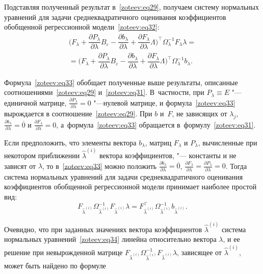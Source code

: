 Подставляя полученный результат в~\eqref{zoteev:eq29}, получаем систему нормальных уравнений для задачи среднеквадратичного оценивания коэффициентов обобщенной регрессионной модели~\eqref{zoteev:eq32}:
\begin{multline}
\Big(F_\lambda+\dfrac{\partial P_\lambda}{\partial \lambda}B_\varepsilon-\dfrac{\partial b_\lambda}{\partial \lambda}+\dfrac{\partial F_\lambda}{\partial \lambda}\Lambda\Big)^{\top}\Omega_\lambda^{-1}F_\lambda \lambda  
=
\\
=\Big(F_\lambda+\dfrac{\partial P_\lambda}{\partial \lambda}B_\varepsilon-\dfrac{\partial b_\lambda}{\partial \lambda}+\dfrac{\partial F_\lambda}{\partial \lambda}\Lambda\Big)^{\top}\Omega_\lambda^{-1}b_\lambda.
\label{zoteev:eq33}
\end{multline}

Формула~\eqref{zoteev:eq33} обобщает полученные выше результаты, описанные соотношениями~\eqref{zoteev:eq29} и~\eqref{zoteev:eq31}. В~частности, при $P_\lambda \equiv E$ "--- единичной матрице, ${\frac{\partial P_\lambda}{\partial \lambda}=0}$  "---нулевой матрице, и формула~\eqref{zoteev:eq33} вырождается в соотношение~\eqref{zoteev:eq29}. 
При $b$ и~$F$, не зависящих от $\lambda_j$, $\frac{\partial b_\lambda}{\partial \lambda}=\overline{0}$ и $\frac{\partial F_\lambda}{\partial \lambda}=0$, а~формула~\eqref{zoteev:eq33} обращается в~формулу~\eqref{zoteev:eq31}.

Если предположить, что элементы вектора $b_\lambda$, матриц $F_\lambda$ и $P_\lambda$, вычисленные при некотором приближении $\hat{\lambda}^{(i)}$ вектора коэффициентов, "--- константы и не зависят от $\lambda$, то в~\eqref{zoteev:eq33} можно положить $\frac{\partial b_\lambda}{\partial \lambda}=\overline{0}$, $\frac{\partial F_\lambda}{\partial \lambda}=\frac{\partial P_\lambda}{\partial \lambda}=0$. 
Тогда система нормальных уравнений для задачи среднеквадратичного оценивания коэффициентов обобщенной регрессионной модели принимает наиболее простой вид:
\begin{equation}
F_{\hat{\lambda}^{(i)}}\Omega_{\hat{\lambda}^{(i)}}^{-1}F_{\hat{\lambda}^{(i)}}\lambda=F_{\hat{\lambda}^{(i)}}^{\top}\Omega_{\hat{\lambda}^{(i)}}^{-1}b_{\hat{\lambda}^{(i)}}.
\label{zoteev:eq34}
\end{equation}

Очевидно, что при заданных значениях вектора коэффициентов $\hat{\lambda}^{(i)}$ система нормальных уравнений~\eqref{zoteev:eq34} линейна относительно вектора $\lambda$, и ее решение при невырожденной матрице $F_{\hat{\lambda}^{(i)}}\Omega_{\hat{\lambda}^{(i)}}^{-1}F_{\hat{\lambda}^{(i)}}\lambda$, зависящее от $\hat{\lambda}^{(i)}$, может быть найдено по формуле


